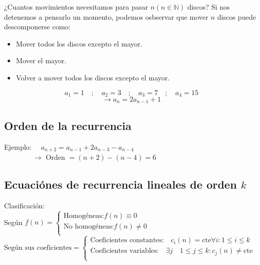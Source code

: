 \documentclass[a4paper, twoside]{article}
\begin{document}
¿Cuantos movimientos necesitamos para pasar $n (n \in \mathbb{N})$ discos?
Si nos detenemos a pensarlo un momento, podemos osbservar que mover $n$ discos puede descomponerse como:

\begin{itemize}
	\item Mover todos los discos excepto el mayor.
	\item Mover el mayor.
	\item Volver a mover todos los discos excepto el mayor.
\end{itemize}

\begin{equation*}
	a_{1} = 1 \quad ; \quad a_{2} = 3 \quad ; \quad a_{3} = 7 \quad ; \quad a_{4} = 15
\end{equation*}
\begin{equation*}
	\rightarrow a_{n} = 2 a_{n-1} + 1
\end{equation*}

\subsection{Orden de la recurrencia}
\begin{center}
	 \par
\end{center}

Ejemplo: $\quad a_{n+2} = a_{n-1} + 2 a_{n-3} - a_{n-4}$\\

$\quad \quad \quad \quad \rightarrow$ Orden $= (n+2) - (n-4) = 6$

\subsection{Ecuaciónes de recurrencia lineales de orden $k$}
Clasificación:\\

Según $f(n) = \left\{ \begin{array}{c}
	\text{Homogéneas:} f(n) \equiv 0\\
	\text{No homogéneas:} f(n) \neq 0\\
	\end{array}\right.$\\

$\text{Según sus coeficientes} = \left\{ \begin{array}{c}
	\text{Coeficientes constantes:} \quad c_{i}(n) = \text{cte} \forall i:1 \le i \le k\\
	\text{Coeficientes variables:} \quad \exists j \quad 1 \le j \le k : c_{j}(n) \neq \text{cte}\\
	\end{array}\right.$
\end{document}
